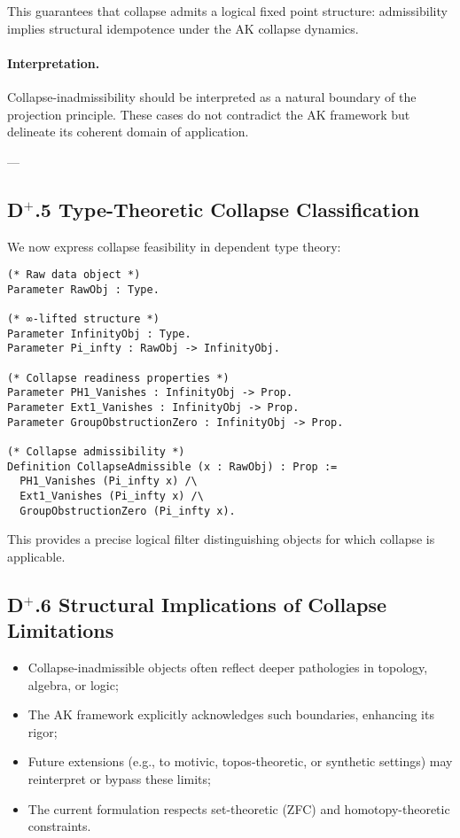 \documentclass[11pt]{article}
\begin{document}
This guarantees that collapse admits a logical fixed point structure: admissibility implies structural idempotence under the AK collapse dynamics.

\paragraph{Interpretation.}
Collapse-inadmissibility should be interpreted as a natural boundary of the projection principle. These cases do not contradict the AK framework but delineate its coherent domain of application.

---

\subsection*{D$^{+}$.5 Type-Theoretic Collapse Classification}

We now express collapse feasibility in dependent type theory:

\begin{lstlisting}[language=Coq, mathescape=false]
(* Raw data object *)
Parameter RawObj : Type.

(* ∞-lifted structure *)
Parameter InfinityObj : Type.
Parameter Pi_infty : RawObj -> InfinityObj.

(* Collapse readiness properties *)
Parameter PH1_Vanishes : InfinityObj -> Prop.
Parameter Ext1_Vanishes : InfinityObj -> Prop.
Parameter GroupObstructionZero : InfinityObj -> Prop.

(* Collapse admissibility *)
Definition CollapseAdmissible (x : RawObj) : Prop :=
  PH1_Vanishes (Pi_infty x) /\
  Ext1_Vanishes (Pi_infty x) /\
  GroupObstructionZero (Pi_infty x).
\end{lstlisting}


This provides a precise logical filter distinguishing objects for which collapse is applicable.

\subsection*{D$^{+}$.6 Structural Implications of Collapse Limitations}

\begin{itemize}
\item Collapse-inadmissible objects often reflect deeper pathologies in topology, algebra, or logic;
\item The AK framework explicitly acknowledges such boundaries, enhancing its rigor;
\item Future extensions (e.g., to motivic, topos-theoretic, or synthetic settings) may reinterpret or bypass these limits;
\item The current formulation respects set-theoretic (ZFC) and homotopy-theoretic constraints.
\end{itemize}
\end{document}
